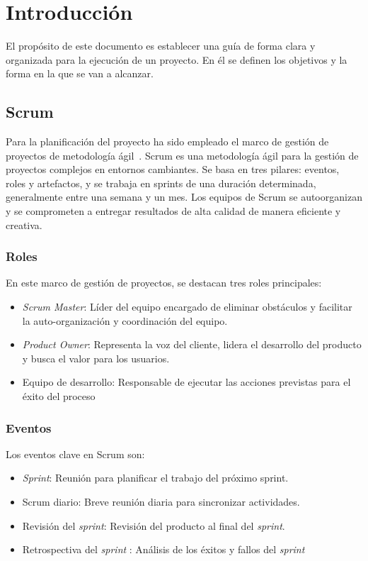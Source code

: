 
\section{Introducción}
El propósito de este documento es establecer una guía de forma clara y organizada para la ejecución de un proyecto. En él se definen los objetivos y la forma en la que se van a alcanzar.


\subsection{Scrum}
Para la planificación del proyecto ha sido empleado el marco de gestión de proyectos de metodología ágil~\cite{scrumMaster2022}. Scrum es una metodología ágil para la gestión de proyectos complejos en entornos cambiantes. Se basa en tres pilares: eventos, roles y artefactos, y se trabaja en sprints de una duración determinada, generalmente entre una semana y un mes. Los equipos de Scrum se autoorganizan y se comprometen a entregar resultados de alta calidad de manera eficiente y creativa.
\subsubsection{Roles}
En este marco de gestión de proyectos, se destacan tres roles principales:

\begin{itemize}
\item \textsl{Scrum Master}: Líder del equipo encargado de eliminar obstáculos y facilitar la auto-organización y coordinación del equipo.
\item \textsl{Product Owner}: Representa la voz del cliente, lidera el desarrollo del producto y busca el valor para los usuarios.
\item Equipo de desarrollo: Responsable de ejecutar las acciones previstas para el éxito del proceso
\end{itemize}
\subsubsection{Eventos}
Los eventos clave en Scrum son:
\begin{itemize}


\item \textsl{Sprint}: Reunión para planificar el trabajo del próximo sprint.
\item Scrum diario: Breve reunión diaria para sincronizar actividades.
\item Revisión del \textsl{sprint}: Revisión del producto al final del \textsl{sprint}.
\item Retrospectiva del \textsl{sprint} : Análisis de los éxitos y fallos del \textsl{sprint}
\end{itemize}




